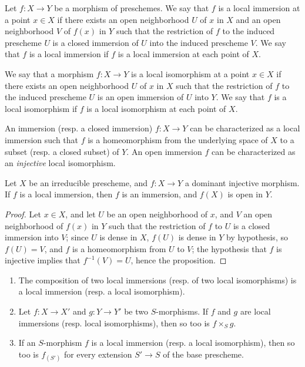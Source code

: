 \begin{defn}[4.5.1]
\label{1.4.5.1}
Let $f:X\to Y$ be a morphism of preschemes.
We say that $f$ is a local immersion at a point $x\in X$ if there exists an open neighborhood $U$ of $x$ in $X$ and an open neighborhood $V$ of $f(x)$ in $Y$ such that the restriction of $f$ to the induced prescheme $U$ is a closed immersion of $U$ into the induced prescheme $V$.
We say that $f$ is a local immersion if $f$ is a local immersion at each point of $X$.
\end{defn}

\begin{defn}[4.5.2]
\label{1.4.5.2}
We say that a morphism $f:X\to Y$ is a local isomorphism at
a point $x\in X$ if there exists an open neighborhood $U$ of $x$ in $X$ such that the restriction of $f$ to the induced prescheme $U$ is an open immersion of $U$ into $Y$.
We say that $f$ is a local isomorphism if $f$ is a local isomorphism at each point of $X$.
\end{defn}

\begin{env}[4.5.3]
\label{1.4.5.3}
An immersion (resp. a closed immersion) $f:X\to Y$ can be characterized as a local immersion such that $f$ is a homeomorphism from the underlying space of $X$ to a subset (resp. a closed subset) of $Y$.
An open immersion $f$ can be characterized as an \emph{injective} local isomorphism.
\end{env}

\begin{prop}[4.5.4]
\label{1.4.5.4}
Let $X$ be an irreducible prescheme, and $f:X\to Y$ a dominant injective morphism.
If $f$ is a local immersion, then $f$ is an immersion, and $f(X)$ is open in $Y$.
\end{prop}

\begin{proof}
\label{proof-1.4.5.4}
Let $x\in X$, and let $U$ be an open neighborhood of $x$, and $V$ an open neighborhood of $f(x)$ in $Y$ such that the restriction of $f$ to $U$ is a closed immersion into $V$;
since $U$ is dense in $X$, $f(U)$ is dense in $Y$ by hypothesis, so $f(U)=V$, and $f$ is a homeomorphism from $U$ to $V$;
the hypothesis that $f$ is injective implies that $f^{-1}(V)=U$, hence the proposition.
\end{proof}

\begin{prop}[4.5.5]
\label{1.4.5.5}
\medskip\noindent
\begin{enumerate}[label=\emph{(\roman*)}]
  \item The composition of two local immersions (resp. of two local isomorphisms) is a local immersion (resp. a local isomorphism).
  \item Let $f:X\to X'$ and $g:Y\to Y'$ be two $S$-morphisms.
    If $f$ and $g$ are local immersions (resp. local isomorphisms), then so too is $f\times_S g$.
  \item If an $S$-morphism $f$ is a local immersion (resp. a local isomorphism), then so too is $f_{(S')}$ for every extension $S'\to S$ of the base prescheme.
\end{enumerate}
\end{prop}

